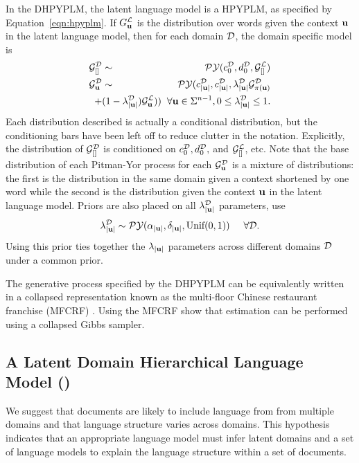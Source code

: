 In the DHPYPLM, the latent language model is a HPYPLM, as specified by Equation~\ref{eqn:hpyplm}.  If $G^\LA_\bu$ is the distribution over words given the context $\bu$ in the latent language model, then for each domain $\D$,  the domain specific model is
%
\begin{eqnarray}
\G^\D_{[]} &\sim& \PY(c^\D_0, d^\D_0,\G^\LA_{[]}) \nonumber \\
\G^\D_\bu &\sim& \PY(c^\D_{|\bu|}, c^\D_{|\bu|}, \lambda^\D_{|\bu|}\G^\D_{\pi(\bu)} \nonumber \\
&& \hspace{-1cm} + (1-\lambda^\D_{|\bu|})\G^\LA_\bu))  \hspace{.2cm} \forall \bu \in \Sigma^{n-1}, 0 \leq \lambda^\D_{|\bu|} \leq 1. \nonumber
\end{eqnarray}
%
Each distribution described is actually a conditional distribution, but the conditioning bars have been left off to reduce clutter in the notation.  Explicitly, the distribution of $\G^\D_{[]}$ is conditioned on $c^\D_0, d^\D_0,$ and $\G^\LA_{[]}$, etc.  Note that the base distribution of each Pitman-Yor process for each $\G^\D_\bu$ is a mixture of distributions: the first is the distribution in the same domain given a context shortened by one word while the second is the distribution given the context $\bu$ in the latent language model. Priors are also placed on all $\lambda^\D_{|\bu|}$ parameters, \cite{Wood2009a} use
%
\begin{eqnarray*}
\lambda^\D_{|\bu|} \sim \PY(\alpha_{|\bu|}, \delta_{|\bu|}, \textrm{Unif}(0,1))  \hspace{.5cm} \forall \D.
\end{eqnarray*}
%
\noindent Using this prior ties together the $\lambda_{|\bu|}$ parameters across different domains $\D$ under a common prior.

The generative process specified by the  DHPYPLM can be equivalently written in a collapsed representation known as the multi-floor Chinese restaurant franchise (MFCRF) \cite{Wood2009a}.  Using the MFCRF \cite{Wood2009a} show that estimation can be performed using a collapsed Gibbs sampler.

\subsection{A Latent Domain Hierarchical Language Model (\ourmodel)}

We suggest that documents are likely to include language from from multiple domains and that language structure varies across domains. This hypothesis indicates that an appropriate language model must infer latent domains and a set of language models to explain the language structure within a set of documents.

